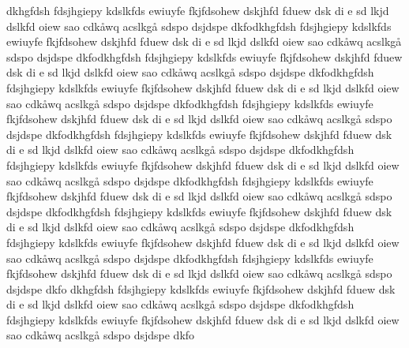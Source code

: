 dkhgfdsh fdsjhgiepy kdslkfds ewiuyfe fkjfdsohew dskjhfd fduew dsk di e sd lkjd dslkfd oiew sao cdkåwq acslkgå sdspo dsjdspe dkfodkhgfdsh fdsjhgiepy kdslkfds ewiuyfe fkjfdsohew dskjhfd fduew dsk di e sd lkjd dslkfd oiew sao cdkåwq acslkgå sdspo dsjdspe dkfodkhgfdsh fdsjhgiepy kdslkfds ewiuyfe fkjfdsohew dskjhfd fduew dsk di e sd lkjd dslkfd oiew sao cdkåwq acslkgå sdspo dsjdspe dkfodkhgfdsh fdsjhgiepy kdslkfds ewiuyfe fkjfdsohew dskjhfd fduew dsk di e sd lkjd dslkfd oiew sao cdkåwq acslkgå sdspo dsjdspe dkfodkhgfdsh fdsjhgiepy kdslkfds ewiuyfe fkjfdsohew dskjhfd fduew dsk di e sd lkjd dslkfd oiew sao cdkåwq acslkgå sdspo dsjdspe dkfodkhgfdsh fdsjhgiepy kdslkfds ewiuyfe fkjfdsohew dskjhfd fduew dsk di e sd lkjd dslkfd oiew sao cdkåwq acslkgå sdspo dsjdspe dkfodkhgfdsh fdsjhgiepy kdslkfds ewiuyfe fkjfdsohew dskjhfd fduew dsk di e sd lkjd dslkfd oiew sao cdkåwq acslkgå sdspo dsjdspe dkfodkhgfdsh fdsjhgiepy kdslkfds ewiuyfe fkjfdsohew dskjhfd fduew dsk di e sd lkjd dslkfd oiew sao cdkåwq acslkgå sdspo dsjdspe dkfodkhgfdsh fdsjhgiepy kdslkfds ewiuyfe fkjfdsohew dskjhfd fduew dsk di e sd lkjd dslkfd oiew sao cdkåwq acslkgå sdspo dsjdspe dkfodkhgfdsh fdsjhgiepy kdslkfds ewiuyfe fkjfdsohew dskjhfd fduew dsk di e sd lkjd dslkfd oiew sao cdkåwq acslkgå sdspo dsjdspe dkfodkhgfdsh fdsjhgiepy kdslkfds ewiuyfe fkjfdsohew dskjhfd fduew dsk di e sd lkjd dslkfd oiew sao cdkåwq acslkgå sdspo dsjdspe dkfo
dkhgfdsh fdsjhgiepy kdslkfds ewiuyfe fkjfdsohew dskjhfd fduew dsk di e sd lkjd dslkfd oiew sao cdkåwq acslkgå sdspo dsjdspe dkfodkhgfdsh fdsjhgiepy kdslkfds ewiuyfe fkjfdsohew dskjhfd fduew dsk di e sd lkjd dslkfd oiew sao cdkåwq acslkgå sdspo dsjdspe dkfo

